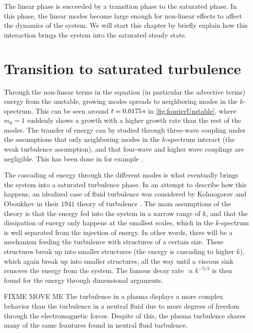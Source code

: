 %
The linear phase is succeeded by a transition phase to the saturated phase.
In this phase, the linear modes become large enough for non-linear effects to affect the dynamics of the system.
We will start this chapter by briefly explain how this interaction brings the system into the saturated steady state.

\section{Transition to saturated turbulence}
Through the non-linear terms in the equation (in particular the advective terms) energy from the unstable, growing modes spreads to neighboring modes in the $k$-spectrum.
This can be seen around $t=0.0175\, \text{s}$ in \cref{fig:fourierUnstable}, where $m_\theta=1$ suddenly shows a growth with a higher growth rate than the rest of the modes.
The transfer of energy can by studied through three-wave coupling under the assumptions that only neighboring modes in the $k$-spectrum interact (the weak turbulence assumption), and that four-wave and higher wave couplings are negligible.
This has been done in for example \cite{Ritz1989,Knorr1990}.

The cascading of energy through the different modes is what eventually brings the system into a saturated turbulence phase.
In an attempt to describe how this happens, an idealized case of fluid turbulence was considered by Kolmogorov and Oboukhov in their $1941$ theory of turbulence \cite{Kolmogorov1962}.
The main assumptions of the theory is that the energy fed into the system in a narrow range of $k$, and that the dissipation of energy only happens at the smallest scales, which in the $k$-spectrum is well separated from the injection of energy.
In other words, there will be a mechanism feeding the turbulence with structures of a certain size.
These structures break up into smaller structures (the energy is cascading to higher $k$), which again break up into smaller structures, all the way until a viscous sink removes the energy from the system.
The famous decay rate $\propto k^{-5/3}$ is then found for the energy through dimensional arguments.

FIXME
MOVE ME
The turbulence in a plasma displays a more complex behavior than the turbulence in a neutral fluid due to more degrees of freedom through the electromagnetic forces.
Despite of this, the plasma turbulence shares many of the same feautures found in neutral fluid turbulence.



